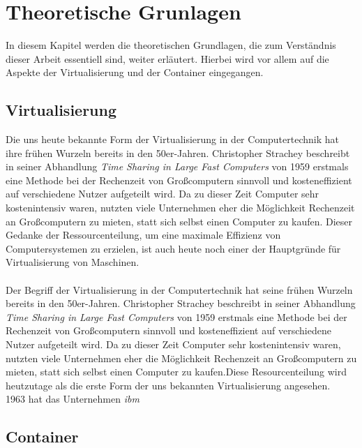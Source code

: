 \chapter{Theoretische Grunlagen}
In diesem Kapitel werden die theoretischen Grundlagen, die zum Verständnis dieser Arbeit essentiell sind, weiter erläutert. Hierbei wird vor allem auf die Aspekte der Virtualisierung und der Container eingegangen.
\section{Virtualisierung}
Die uns heute bekannte Form der Virtualisierung in der Computertechnik hat ihre frühen Wurzeln bereits in den 50er-Jahren. Christopher Strachey beschreibt in seiner Abhandlung \textit{Time Sharing in Large Fast Computers} von 1959 erstmals eine Methode bei der Rechenzeit von Großcomputern sinnvoll und kosteneffizient auf verschiedene Nutzer aufgeteilt wird.\autocite[Vgl.][]{McCarthy.1983} Da zu dieser Zeit Computer sehr kostenintensiv waren, nutzten viele Unternehmen eher die Möglichkeit Rechenzeit an Großcomputern zu mieten, statt sich selbst einen Computer zu kaufen. Dieser Gedanke der Ressourcenteilung, um eine maximale Effizienz von Computersystemen zu erzielen, ist auch heute noch einer der Hauptgründe für Virtualisierung von Maschinen.\\
\\
Der Begriff der Virtualisierung in der Computertechnik hat seine frühen Wurzeln bereits in den 50er-Jahren. Christopher Strachey beschreibt in seiner Abhandlung \textit{Time Sharing in Large Fast Computers} von 1959 erstmals eine Methode bei der Rechenzeit von Großcomputern sinnvoll und kosteneffizient auf verschiedene Nutzer aufgeteilt wird. Da zu dieser Zeit Computer sehr kostenintensiv waren, nutzten viele Unternehmen eher die Möglichkeit Rechenzeit an Großcomputern zu mieten, statt sich selbst einen Computer zu kaufen.\autocite[Vgl.][S. 18ff.]{Docker.2016}Diese Resourcenteilung wird heutzutage als die erste Form der uns bekannten Virtualisierung angesehen.\\
1963 hat das Unternehmen \textit{\ac{ibm}}

\section{Container}
